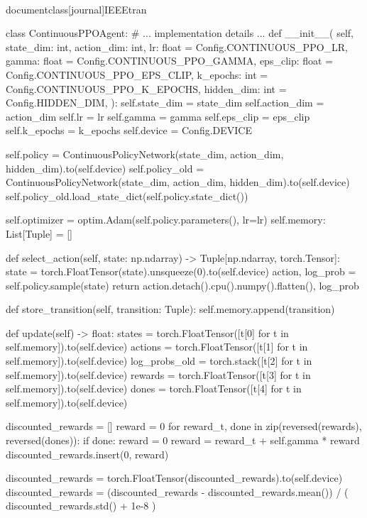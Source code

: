 \\documentclass[journal]{IEEEtran}
\begin{document}
class ContinuousPPOAgent:
    # ... implementation details ...
    def __init__(
        self,
        state_dim: int,
        action_dim: int,
        lr: float = Config.CONTINUOUS_PPO_LR,
        gamma: float = Config.CONTINUOUS_PPO_GAMMA,
        eps_clip: float = Config.CONTINUOUS_PPO_EPS_CLIP,
        k_epochs: int = Config.CONTINUOUS_PPO_K_EPOCHS,
        hidden_dim: int = Config.HIDDEN_DIM,
    ):
        self.state_dim = state_dim
        self.action_dim = action_dim
        self.lr = lr
        self.gamma = gamma
        self.eps_clip = eps_clip
        self.k_epochs = k_epochs
        self.device = Config.DEVICE

        self.policy = ContinuousPolicyNetwork(state_dim, action_dim, hidden_dim).to(self.device)
        self.policy_old = ContinuousPolicyNetwork(state_dim, action_dim, hidden_dim).to(self.device)
        self.policy_old.load_state_dict(self.policy.state_dict())

        self.optimizer = optim.Adam(self.policy.parameters(), lr=lr)
        self.memory: List[Tuple] = []

    def select_action(self, state: np.ndarray) -> Tuple[np.ndarray, torch.Tensor]:
        state = torch.FloatTensor(state).unsqueeze(0).to(self.device)
        action, log_prob = self.policy.sample(state)
        return action.detach().cpu().numpy().flatten(), log_prob

    def store_transition(self, transition: Tuple):
        self.memory.append(transition)

    def update(self) -> float:
        states = torch.FloatTensor([t[0] for t in self.memory]).to(self.device)
        actions = torch.FloatTensor([t[1] for t in self.memory]).to(self.device)
        log_probs_old = torch.stack([t[2] for t in self.memory]).to(self.device)
        rewards = torch.FloatTensor([t[3] for t in self.memory]).to(self.device)
        dones = torch.FloatTensor([t[4] for t in self.memory]).to(self.device)

        discounted_rewards = []
        reward = 0
        for reward_t, done in zip(reversed(rewards), reversed(dones)):
            if done:
                reward = 0
            reward = reward_t + self.gamma * reward
            discounted_rewards.insert(0, reward)

        discounted_rewards = torch.FloatTensor(discounted_rewards).to(self.device)
        discounted_rewards = (discounted_rewards - discounted_rewards.mean()) / (
            discounted_rewards.std() + 1e-8
        )
\end{document}
